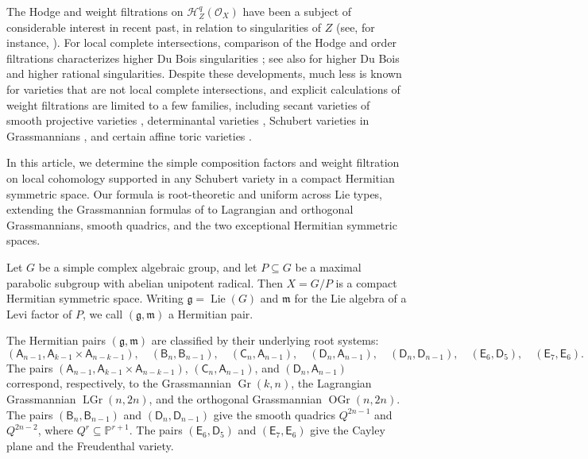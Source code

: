\documentclass[12pt]{amsart}
\newcommand{\defi}[1]{{\upshape\sffamily #1}}
\theoremstyle{definition}
\numberwithin{equation}{section}
\newcommand{\g}{\mathfrak g}
\newcommand{\m}{\mathfrak m}
\begin{document}
The Hodge and weight filtrations on $\mathscr{H}^q_Z(\mathscr{O}_X)$ have been a subject of considerable interest in recent past, in relation to singularities of $Z$ (see, for instance, \cites{MP1,MP4,CDMO,ParkPopa,DORhrh}). For local complete intersections, comparison of the Hodge and
order filtrations characterizes higher Du Bois singularities
\cite{MP4}; see also \cites{MOPW,JKSY,FL,MPkr} for higher Du Bois and higher rational singularities. Despite these developments, much less is known for varieties that are not local complete intersections, and explicit calculations of weight filtrations are limited to a few families, including secant varieties of smooth projective varieties \cite{CDORsecant}, determinantal varieties \cites{raicu2016local,iterated,MHM}, Schubert varieties in Grassmannians \cite{schubertLC}, and certain affine toric varieties \cite{KVlocal}.

In this article, we determine the simple composition factors and
weight filtration on local cohomology supported in any Schubert
variety in a compact Hermitian symmetric space. Our formula is root-theoretic and uniform across Lie types, extending the
Grassmannian formulas of \cite{schubertLC} to Lagrangian and
orthogonal Grassmannians, smooth quadrics, and the two exceptional
Hermitian symmetric spaces.

Let $G$ be a simple complex algebraic group, and let $P\subseteq G$
be a maximal parabolic subgroup with abelian unipotent radical.
Then $X=G/P$ is a compact Hermitian symmetric space. Writing
$\g=\operatorname{Lie}(G)$ and $\m$ for the Lie algebra of a Levi
factor of $P$, we call $(\g,\m)$ a \defi{Hermitian pair}.

\noindent The Hermitian pairs $(\g,\m)$ are classified by their underlying root systems:
\[
(\mathsf{A}_{n-1},\mathsf{A}_{k-1}\times \mathsf{A}_{n-k-1}),\quad
(\mathsf{B}_n,\mathsf{B}_{n-1}),\quad (\mathsf{C}_n,\mathsf{A}_{n-1}),\quad (\mathsf{D}_n,\mathsf{A}_{n-1}),\quad (\mathsf{D}_n,\mathsf{D}_{n-1}),\quad (\mathsf{E}_6,\mathsf{D}_5),\quad (\mathsf{E}_7,\mathsf{E}_6).
\]
The pairs
$(\mathsf A_{n-1},\mathsf A_{k-1}\times\mathsf A_{n-k-1})$,
$(\mathsf C_n,\mathsf A_{n-1})$, and
$(\mathsf D_n,\mathsf A_{n-1})$ correspond, respectively, to
the Grassmannian $\operatorname{Gr}(k,n)$, the Lagrangian
Grassmannian $\operatorname{LGr}(n,2n)$, and the orthogonal Grassmannian
$\operatorname{OGr}(n,2n)$.
The pairs $(\mathsf B_n,\mathsf B_{n-1})$ and
$(\mathsf D_n,\mathsf D_{n-1})$ give the smooth quadrics
$Q^{2n-1}$ and $Q^{2n-2}$, where
$Q^r\subseteq\mathbb P^{r+1}$.
The pairs $(\mathsf E_6,\mathsf D_5)$ and
$(\mathsf E_7,\mathsf E_6)$ give the Cayley plane and
the Freudenthal variety.
\end{document}
